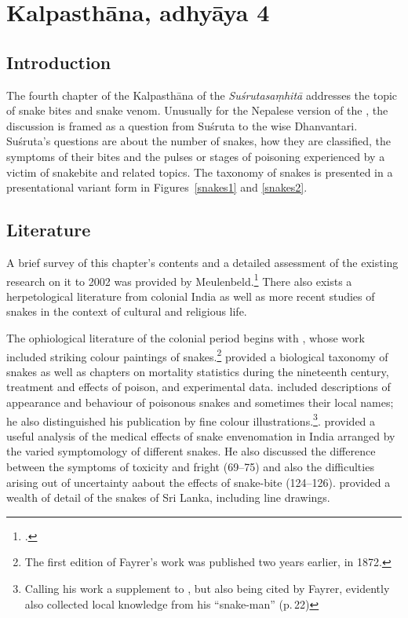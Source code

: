 \section{Kalpasthāna, adhyāya 4}

\subsection{Introduction} The fourth chapter of the Kalpasthāna of the
\emph{Suśrutasaṃhitā} addresses the topic of snake bites and snake venom. 
Unusually for the Nepalese version of the \SS, the discussion is framed as a
question from Suśruta to the wise Dhanvantari.  Suśruta's questions are
about the number of snakes, how they are classified, the symptoms of their
bites and the pulses or stages of poisoning experienced by a victim of
snakebite and related topics.  The taxonomy of snakes is presented in a
presentational variant form in Figures~\ref{snakes1} and \ref{snakes2}.


    
\subsection{Literature} 

A brief survey of this chapter's contents and a detailed assessment of the
existing research on it to 2002 was provided by Meulenbeld.\footcite[IA,
292--294]{meul-hist} There also exists a herpetological literature from
colonial India as well as more recent studies of snakes in the context of
cultural and religious life. 

The ophiological literature of the colonial period begins with
\citet{fayr-1874}, whose work included striking colour paintings of
snakes.\footnote{The first edition of Fayrer's work was published two years
    earlier, in 1872.} \citeauthor{fayr-1874} provided a biological taxonomy of
    snakes as well as chapters on mortality statistics during the nineteenth
    century, treatment and effects of poison, and experimental data.
    \citet{ewar-1878} included descriptions of appearance and behaviour of
    poisonous snakes and sometimes their local names; he also distinguished his
    publication by fine colour illustrations.\footnote{Calling his work a
        supplement to \citet{fayr-1874}, but also being cited by Fayrer,
        \cite{ewar-1878} evidently also collected local knowledge from his
        “snake-man” (p.\,22)}. \citet[75--124]{wall-1913} provided a useful analysis
        of the medical effects of snake envenomation in India arranged by the varied
        symptomology of different snakes.  He also discussed the difference between
        the symptoms of toxicity and fright (69--75) and also the difficulties
        arising out of uncertainty aabout the effects of snake-bite (124--126).
        \citet{wall-1921} provided a wealth of detail of the snakes of Sri Lanka,
        including line drawings. 
        
